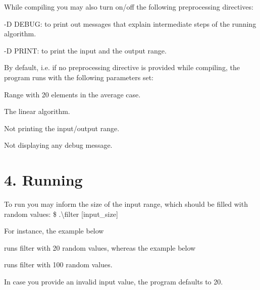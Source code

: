 While compiling you may also turn on/off the following preprocessing directives\+:


\begin{DoxyItemize}
\item {\ttfamily -\/D D\+E\+B\+UG}\+: to print out messages that explain intermediate steps of the running algorithm.
\item {\ttfamily -\/D P\+R\+I\+NT}\+: to print the input and the output range.
\end{DoxyItemize}

By default, i.\+e. if no preprocessing directive is provided while compiling, the program runs with the following parameters set\+:


\begin{DoxyItemize}
\item Range with 20 elements in the average case.
\item The linear algorithm.
\item Not printing the input/output range.
\item Not displaying any debug message.
\end{DoxyItemize}

\section*{4. Running}

To run you may inform the size of the input range, which should be filled with random values\+: {\ttfamily \$ .\textbackslash{}filter \mbox{[}input\+\_\+size\mbox{]}}

For instance, the example below


\begin{DoxyCode}{0}
\end{DoxyCode}


runs filter with 20 random values, whereas the example below


\begin{DoxyCode}{0}
\end{DoxyCode}


runs filter with 100 random values.

In case you provide an invalid input value, the program defaults to 20. 